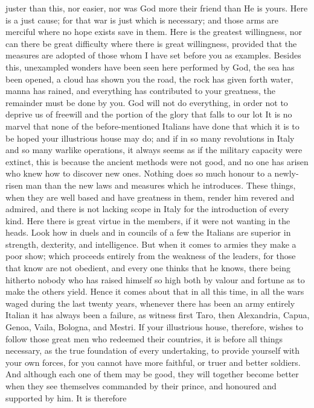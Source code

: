 \documentclass[12pt,letterpaper]{memoir}
\begin{document}
juster than this, nor easier, nor was God more their friend than He is
yours. Here is a just cause; for that war is just which is necessary;
and those arms are merciful where no hope exists save in them. Here
is the greatest willingness, nor can there be great difficulty where
there is great willingness, provided that the measures are adopted of
those whom I have set before you as examples. Besides this, unexampled
wonders have been seen here performed by God, the sea has been opened,
a cloud has shown you the road, the rock has given forth water, manna
has rained, and everything has contributed to your greatness, the
remainder must be done by you. God will not do everything, in order
not to deprive us of freewill and the portion of the glory that falls
to our lot It is no marvel that none of the before-mentioned Italians
have done that which it is to be hoped your illustrious house may do;
and if in so many revolutions in Italy and so many warlike operations,
it always seems as if the military capacity were extinct, this is
because the ancient methods were not good, and no one has arisen
who knew how to discover new ones. Nothing does so much honour to a
newly-risen man than the new laws and measures which he introduces.
These things, when they are well based and have greatness in them,
render him revered and admired, and there is not lacking scope in Italy
for the introduction of every kind. Here there is great virtue in the
members, if it were not wanting in the heads. Look how in duels and in
councils of a few the Italians are superior in strength, dexterity,
and intelligence. But when it comes to armies they make a poor show;
which proceeds entirely from the weakness of the leaders, for those
that know are not obedient, and every one thinks that he knows, there
being hitherto nobody who has raised himself so high both by valour and
fortune as to make the others yield. Hence it comes about that in all
this time, in all the wars waged during the last twenty years, whenever
there has been an army entirely Italian it has always been a failure,
as witness first Taro, then Alexandria, Capua, Genoa, Vaila, Bologna,
and Mestri. If your illustrious house, therefore, wishes to follow
those great men who redeemed their countries, it is before all things
necessary, as the true foundation of every undertaking, to provide
yourself with your own forces, for you cannot have more faithful, or
truer and better soldiers. And although each one of them may be good,
they will together become better when they see themselves commanded
by their prince, and honoured and supported by him. It is therefore
\end{document}
